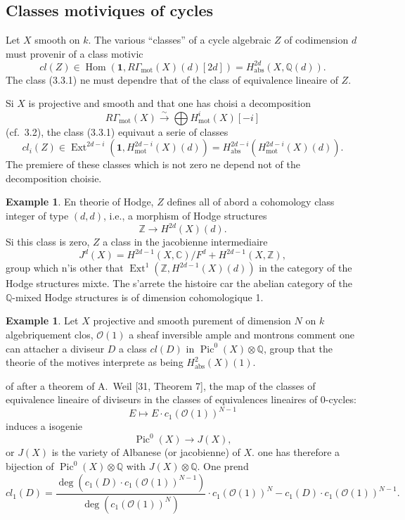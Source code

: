 \documentclass[11pt,a4paper]{article}
\theoremstyle{plain}
\theoremstyle{definition}
\newtheorem{example}[theorem]{Example}
\DeclareMathOperator{\Ext}{Ext}
\DeclareMathOperator{\Hom}{Hom}
\DeclareMathOperator{\Pic}{Pic}
\newcommand{\Q}{\mathbb{Q}}
\newcommand{\Z}{\mathbb{Z}}
\newcommand{\C}{\mathbb{C}}
\DeclareMathOperator{\mot}{mot}
\newcommand{\abs}{\mathrm{abs}}
\begin{document}
\subsection{Classes motiviques of cycles}

Let $X$ smooth on $k$. The various ``classes'' of a cycle algebraic $Z$ of codimension $d$ must provenir of a class motivic
\begin{equation}
\tag{3.3.1}
cl(Z) \in \Hom(\mathbf{1}, R\Gamma_{\mot}(X)(d)[2d]) = H^{2d}_{\abs}(X, \Q(d)).
\end{equation}
The class (3.3.1) ne must dependre that of the class of equivalence lineaire of $Z$.

Si $X$ is projective and smooth and that one has choisi a decomposition
\begin{equation}
\tag{$*$}
R\Gamma_{\mot}(X) \xrightarrow{\sim} \bigoplus H^i_{\mot}(X)[-i]
\end{equation}
(cf.~3.2), the class (3.3.1) equivaut a serie of classes
\begin{equation}
\tag{3.3.2}
cl_i(Z) \in \Ext^{2d-i}(\mathbf{1}, H^{2d-i}_{\mot}(X)(d)) = H^{2d-i}_{\abs}(H^{2d-i}_{\mot}(X)(d)).
\end{equation}
The premiere of these classes which is not zero ne depend not of the decomposition choisie.

\begin{example}
En theorie of Hodge, $Z$ defines all of abord a cohomology class integer of type $(d, d)$, i.e., a morphism of Hodge structures
$$
\Z \to H^{2d}(X)(d).
$$
Si this class is zero, $Z$ a class in the jacobienne intermediaire
$$
J^d(X) = H^{2d-1}(X, \C) / F^d + H^{2d-1}(X, \Z),
$$
group which n'is other that $\Ext^1(\Z, H^{2d-1}(X)(d))$ in the category of the Hodge structures mixte. The s'arrete the histoire car the abelian category of the $\Q$-mixed Hodge structures is of dimension cohomologique 1.
\end{example}

\begin{example}
Let $X$ projective and smooth purement of dimension $N$ on $k$ algebriquement clos, $\mathcal{O}(1)$ a sheaf inversible ample and montrons comment one can attacher a diviseur $D$ a class $cl(D)$ in $\Pic^0(X) \otimes \Q$, group that the theorie of the motives interprete as being $H^{2}_{\abs}(X)(1)$.

of after a theorem of A.~Weil [31, Theorem 7], the map of the classes of equivalence lineaire of diviseurs in the classes of equivalences lineaires of 0-cycles:
$$
E \mapsto E \cdot c_1(\mathcal{O}(1))^{N-1}
$$
induces a isogenie
$$
\Pic^0(X) \to J(X),
$$
or $J(X)$ is the variety of Albanese (or jacobienne) of $X$. one has therefore a bijection of $\Pic^0(X) \otimes \Q$ with $J(X) \otimes \Q$. One prend
$$
cl_1(D) = \frac{\deg(c_1(D) \cdot c_1(\mathcal{O}(1))^{N-1})}{\deg(c_1(\mathcal{O}(1))^N)} \cdot c_1(\mathcal{O}(1))^N - c_1(D) \cdot c_1(\mathcal{O}(1))^{N-1}.
$$
\end{example}
\end{document}
